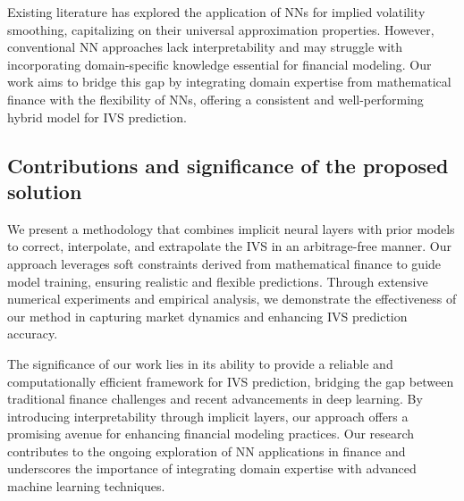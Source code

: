 Existing literature has explored the application of NNs for implied volatility smoothing, capitalizing on their universal approximation properties. However, conventional NN approaches lack interpretability and may struggle with incorporating domain-specific knowledge essential for financial modeling. Our work aims to bridge this gap by integrating domain expertise from mathematical finance with the flexibility of NNs, offering a consistent and well-performing hybrid model for IVS prediction.

\subsection{Contributions and significance of the proposed solution}
We present a methodology that combines implicit neural layers with prior models to correct, interpolate, and extrapolate the IVS in an arbitrage-free manner. Our approach leverages soft constraints derived from mathematical finance to guide model training, ensuring realistic and flexible predictions. Through extensive numerical experiments and empirical analysis, we demonstrate the effectiveness of our method in capturing market dynamics and enhancing IVS prediction accuracy.

The significance of our work lies in its ability to provide a reliable and computationally efficient framework for IVS prediction, bridging the gap between traditional finance challenges and recent advancements in deep learning. By introducing interpretability through implicit layers, our approach offers a promising avenue for enhancing financial modeling practices. Our research contributes to the ongoing exploration of NN applications in finance and underscores the importance of integrating domain expertise with advanced machine learning techniques.